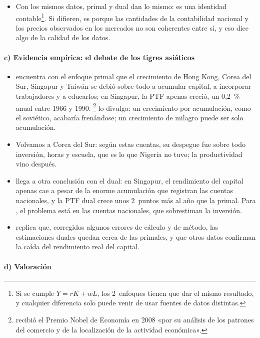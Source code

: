 \documentclass[11pt]{article}
\begin{document}
\begin{itemize}
\item Con los mismos datos, primal y dual dan lo mismo: es una identidad contable\footnote{Si se cumple $Y=rK+wL$, los 2~enfoques tienen que dar el mismo resultado, y cualquier diferencia solo puede venir de usar fuentes de datos distintas.}. Si difieren, es porque las cantidades de la contabilidad nacional y los precios observados en los mercados no son coherentes entre sí, y eso dice algo de la calidad de los datos.
\end{itemize}

\paragraph{c) Evidencia empírica: el debate de los tigres asiáticos}

\begin{itemize}
\item \textcite{Young1995} encuentra con el enfoque primal que el crecimiento de Hong Kong, Corea del Sur, Singapur y Taiwán se debió sobre todo a acumular capital, a incorporar trabajadores y a educarlos; en Singapur, la PTF apenas creció, un 0,2~\% anual entre 1966 y 1990. \textcite{Krugman1994Myth}\footnote{ recibió el Premio Nobel de Economía en 2008 «por su análisis de los patrones del comercio y de la localización de la actividad económica»\nocite{Nobel2008Krugman}.} lo divulga: un crecimiento por acumulación, como el soviético, acabaría frenándose; un crecimiento de milagro puede ser solo acumulación.
\item Volvamos a Corea del Sur: según estas cuentas, su despegue fue sobre todo inversión, horas y escuela, que es lo que Nigeria no tuvo; la productividad vino después.
\item \textcite{Hsieh2002} llega a otra conclusión con el dual: en Singapur, el rendimiento del capital apenas cae a pesar de la enorme acumulación que registran las cuentas nacionales, y la PTF dual crece unos 2~puntos más al año que la primal\nocite{FernaldNeiman2011}. Para , el problema está en las cuentas nacionales, que sobrestiman la inversión.
\item \textcite{Young1998} replica que, corregidos algunos errores de cálculo y de método, las estimaciones duales quedan cerca de las primales, y que otros datos confirman la caída del rendimiento real del capital.
\end{itemize}

\paragraph{d) Valoración}
\end{document}
